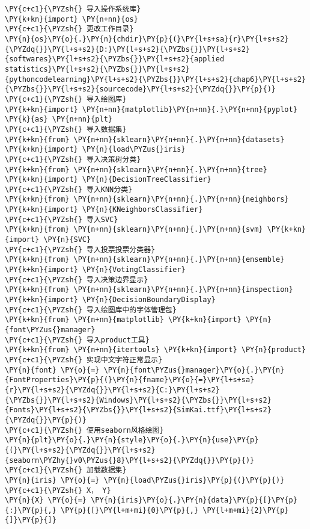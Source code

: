 \begin{Verbatim}[commandchars=\\\{\}]
\PY{c+c1}{\PYZsh{} 导入操作系统库}
\PY{k+kn}{import} \PY{n+nn}{os}
\PY{c+c1}{\PYZsh{} 更改工作目录}
\PY{n}{os}\PY{o}{.}\PY{n}{chdir}\PY{p}{(}\PY{l+s+sa}{r}\PY{l+s+s2}{\PYZdq{}}\PY{l+s+s2}{D:}\PY{l+s+s2}{\PYZbs{}}\PY{l+s+s2}{softwares}\PY{l+s+s2}{\PYZbs{}}\PY{l+s+s2}{applied statistics}\PY{l+s+s2}{\PYZbs{}}\PY{l+s+s2}{pythoncodelearning}\PY{l+s+s2}{\PYZbs{}}\PY{l+s+s2}{chap6}\PY{l+s+s2}{\PYZbs{}}\PY{l+s+s2}{sourcecode}\PY{l+s+s2}{\PYZdq{}}\PY{p}{)}
\PY{c+c1}{\PYZsh{} 导入绘图库}
\PY{k+kn}{import} \PY{n+nn}{matplotlib}\PY{n+nn}{.}\PY{n+nn}{pyplot} \PY{k}{as} \PY{n+nn}{plt}
\PY{c+c1}{\PYZsh{} 导入数据集}
\PY{k+kn}{from} \PY{n+nn}{sklearn}\PY{n+nn}{.}\PY{n+nn}{datasets} \PY{k+kn}{import} \PY{n}{load\PYZus{}iris}
\PY{c+c1}{\PYZsh{} 导入决策树分类}
\PY{k+kn}{from} \PY{n+nn}{sklearn}\PY{n+nn}{.}\PY{n+nn}{tree} \PY{k+kn}{import} \PY{n}{DecisionTreeClassifier}
\PY{c+c1}{\PYZsh{} 导入KNN分类}
\PY{k+kn}{from} \PY{n+nn}{sklearn}\PY{n+nn}{.}\PY{n+nn}{neighbors} \PY{k+kn}{import} \PY{n}{KNeighborsClassifier}
\PY{c+c1}{\PYZsh{} 导入SVC}
\PY{k+kn}{from} \PY{n+nn}{sklearn}\PY{n+nn}{.}\PY{n+nn}{svm} \PY{k+kn}{import} \PY{n}{SVC}
\PY{c+c1}{\PYZsh{} 导入投票投票分类器}
\PY{k+kn}{from} \PY{n+nn}{sklearn}\PY{n+nn}{.}\PY{n+nn}{ensemble} \PY{k+kn}{import} \PY{n}{VotingClassifier}
\PY{c+c1}{\PYZsh{} 导入决策边界显示}
\PY{k+kn}{from} \PY{n+nn}{sklearn}\PY{n+nn}{.}\PY{n+nn}{inspection} \PY{k+kn}{import} \PY{n}{DecisionBoundaryDisplay}
\PY{c+c1}{\PYZsh{} 导入绘图库中的字体管理包}
\PY{k+kn}{from} \PY{n+nn}{matplotlib} \PY{k+kn}{import} \PY{n}{font\PYZus{}manager}
\PY{c+c1}{\PYZsh{} 导入product工具}
\PY{k+kn}{from} \PY{n+nn}{itertools} \PY{k+kn}{import} \PY{n}{product}
\PY{c+c1}{\PYZsh{} 实现中文字符正常显示}
\PY{n}{font} \PY{o}{=} \PY{n}{font\PYZus{}manager}\PY{o}{.}\PY{n}{FontProperties}\PY{p}{(}\PY{n}{fname}\PY{o}{=}\PY{l+s+sa}{r}\PY{l+s+s2}{\PYZdq{}}\PY{l+s+s2}{C:}\PY{l+s+s2}{\PYZbs{}}\PY{l+s+s2}{Windows}\PY{l+s+s2}{\PYZbs{}}\PY{l+s+s2}{Fonts}\PY{l+s+s2}{\PYZbs{}}\PY{l+s+s2}{SimKai.ttf}\PY{l+s+s2}{\PYZdq{}}\PY{p}{)}
\PY{c+c1}{\PYZsh{} 使用seaborn风格绘图}
\PY{n}{plt}\PY{o}{.}\PY{n}{style}\PY{o}{.}\PY{n}{use}\PY{p}{(}\PY{l+s+s2}{\PYZdq{}}\PY{l+s+s2}{seaborn\PYZhy{}v0\PYZus{}8}\PY{l+s+s2}{\PYZdq{}}\PY{p}{)}
\PY{c+c1}{\PYZsh{} 加载数据集}
\PY{n}{iris} \PY{o}{=} \PY{n}{load\PYZus{}iris}\PY{p}{(}\PY{p}{)}
\PY{c+c1}{\PYZsh{} X， Y}
\PY{n}{X} \PY{o}{=} \PY{n}{iris}\PY{o}{.}\PY{n}{data}\PY{p}{[}\PY{p}{:}\PY{p}{,} \PY{p}{[}\PY{l+m+mi}{0}\PY{p}{,} \PY{l+m+mi}{2}\PY{p}{]}\PY{p}{]}

\end{Verbatim}
